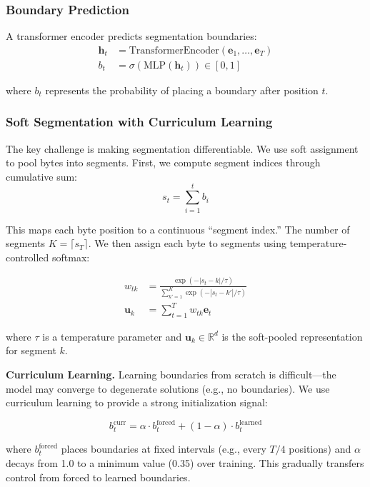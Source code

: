 \documentclass{article}
\begin{document}
\subsubsection{Boundary Prediction}

A transformer encoder predicts segmentation boundaries:
\begin{align}
\mathbf{h}_t &= \text{TransformerEncoder}(\mathbf{e}_1, \ldots, \mathbf{e}_T) \\
b_t &= \sigma(\text{MLP}(\mathbf{h}_t)) \in [0, 1]
\end{align}

where $b_t$ represents the probability of placing a boundary after position $t$.

\subsubsection{Soft Segmentation with Curriculum Learning}

The key challenge is making segmentation differentiable. We use soft assignment to pool bytes into segments. First, we compute segment indices through cumulative sum:
\begin{equation}
s_t = \sum_{i=1}^{t} b_i
\end{equation}

This maps each byte position to a continuous ``segment index.'' The number of segments $K = \lceil s_T \rceil$. We then assign each byte to segments using temperature-controlled softmax:

\begin{align}
w_{tk} &= \frac{\exp(-|s_t - k| / \tau)}{\sum_{k'=1}^{K} \exp(-|s_t - k'| / \tau)} \\
\mathbf{u}_k &= \sum_{t=1}^{T} w_{tk} \mathbf{e}_t
\end{align}

where $\tau$ is a temperature parameter and $\mathbf{u}_k \in \mathbb{R}^{d}$ is the soft-pooled representation for segment $k$.

\textbf{Curriculum Learning.} Learning boundaries from scratch is difficult—the model may converge to degenerate solutions (e.g., no boundaries). We use curriculum learning to provide a strong initialization signal:

\begin{equation}
b_t^{\text{curr}} = \alpha \cdot b_t^{\text{forced}} + (1 - \alpha) \cdot b_t^{\text{learned}}
\end{equation}

where $b_t^{\text{forced}}$ places boundaries at fixed intervals (e.g., every $T/4$ positions) and $\alpha$ decays from 1.0 to a minimum value (0.35) over training. This gradually transfers control from forced to learned boundaries.
\end{document}
